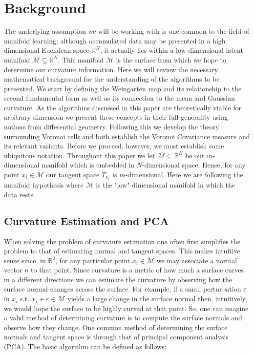 \documentclass{article}
\begin{document}
\section{Background}

The underlying assumption we will be working with is one common to the field of manifold learning; although accumulated data may be presented in a high dimensional Euclidean space $\mathbb{R}^N$, it actually lies within a low dimensional latent manifold $\mathcal{M} \subseteq \mathbb{R}^N$. This manifold $\mathcal{M}$ is the surface from which we hope to determine our curvature information. Here we will review the necessary mathematical background for the understanding of the algorithms to be presented. We start by defining the Weingarten map and its relationship to the second fundamental form as well as its connection to the mean and Gaussian curvature. As the algorithms discussed in this paper are theoretically viable for arbitrary dimension we present these concepts in their full generality using notions from differential geometry. Following this we develop the theory surrounding Voronoi cells and both establish the Voronoi Covariance measure and its relevant variants. Before we proceed, however, we must establish some ubiquitous notation. Throughout this paper we let $\mathcal{M} \subseteq \mathbb{R}^N$ be our $m$-dimensional manifold which is embedded in $N$-dimensional space. Hence, for any point $x_i \in \mathcal{M}$ our tangent space $T_{x_i}$ is $m$-dimensional. Here we are following the manifold hypothesis where $\mathcal{M}$ is the "low" dimensional manifold in which the data rests.  


\subsection{Curvature Estimation and PCA}
When solving the problem of curvature estimation one often first simplifies the problem to that of estimating normal and tangent spaces. This makes intuitive sense since, in $\mathbb{R}^3$, for any particular point $x_i \in \mathcal{M}$ we may associate a normal vector $n$ to that point. Since curvature is a metric of how much a surface curves in a different directions we can estimate the curvature by observing how the surface normal changes across the surface. For example, if a small perturbation $\varepsilon$ in $x_i$ s.t. $x_i + \varepsilon \in \mathcal{M}$ yields a large change in the surface normal then, intuitively, we would hope the surface to be highly curved at that point. So, one can imagine a valid method of determining curvature is to compute the surface normals and observe how they change.   
One common method of determining the surface normals and tangent space is through that of principal component analysis (PCA). The basic algorithm can be defined as follows:
\end{document}
